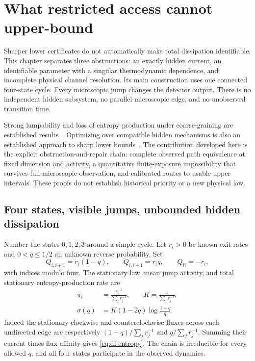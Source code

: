 \chapter{What restricted access cannot upper-bound}
\label{ch:dissipation-limits}

Sharper lower certificates do not automatically make total dissipation
identifiable. This chapter separates three obstructions: an exactly hidden
current, an identifiable parameter with a singular thermodynamic dependence,
and incomplete physical channel resolution. Its main construction uses one
connected four-state cycle. Every microscopic jump changes the detector output.
There is no independent hidden subsystem, no parallel microscopic edge, and no
unobserved transition time.

Strong lumpability and loss of entropy production under coarse-graining are
established results~\cite{ac_buchholz,ciBusiello2019}. Optimizing over compatible
hidden mechanisms is also an established approach to sharp lower
bounds~\cite{ciEhrich2021,ciNitzan2023}. The contribution developed here is the
explicit obstruction-and-repair chain: complete observed path equivalence at
fixed dimension and activity, a quantitative finite-exposure impossibility that
survives full microscopic observation, and calibrated routes to usable upper
intervals. These proofs do not establish historical priority or a new physical
law.

\section{Four states, visible jumps, unbounded hidden dissipation}
Number the states $0,1,2,3$ around a simple cycle. Let $r_i>0$ be known exit
rates and $0<q\le1/2$ an unknown reverse probability. Set
\begin{equation}
 Q_{i,i+1}=r_i(1-q),\qquad Q_{i,i-1}=r_iq,\qquad Q_{ii}=-r_i,
                                                        \label{eq:dl-cycle}
\end{equation}
with indices modulo four. The stationary law, mean jump activity, and total
stationary entropy-production rate are
\begin{align}
 \pi_i&=\frac{r_i^{-1}}{\sum_j r_j^{-1}},\qquad
 K=\frac4{\sum_j r_j^{-1}},\\
 \sigma(q)&=K(1-2q)\log\frac{1-q}{q}.                    \label{eq:dl-entropy}
\end{align}
Indeed the stationary clockwise and counterclockwise fluxes across each
undirected edge are respectively $(1-q)/\sum_jr_j^{-1}$ and
$q/\sum_jr_j^{-1}$. Summing their current times flux affinity gives
\eqref{eq:dl-entropy}. The chain is irreducible for every allowed $q$, and all
four states participate in the observed dynamics.

